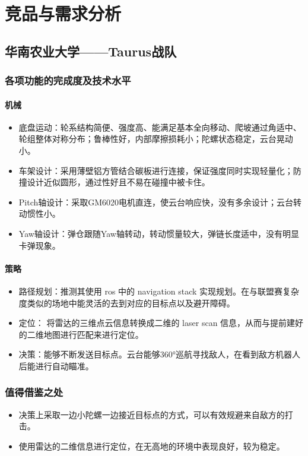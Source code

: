\chapter{竞品与需求分析}
\section{华南农业大学——Taurus战队}
\subsection{各项功能的完成度及技术水平}

\subsubsection{机械}
\begin{itemize}
      \item 底盘运动：轮系结构简便、强度高、能满足基本全向移动、爬坡通过角适中、轮组整体对称分布；鲁棒性好，内部摩擦损耗小；陀螺状态稳定，云台晃动小。
      \item 车架设计：采用薄壁铝方管结合碳板进行连接，保证强度同时实现轻量化；防撞设计近似圆形，通过性好且不易在碰撞中被卡住。
      \item Pitch轴设计：采取GM6020电机直连，使云台响应快，没有多余设计；云台转动惯性小。
      \item Yaw轴设计：弹仓跟随Yaw轴转动，转动惯量较大，弹链长度适中，没有明显卡弹现象。
\end{itemize}

\subsubsection{策略}
\begin{itemize}
      \item 路径规划：推测其使用 ros 中的 navigation stack 实现规划。在与联盟赛复杂度类似的场地中能灵活的去到对应的目标点以及避开障碍。
      \item 定位： 将雷达的三维点云信息转换成二维的 laser scan 信息，从而与提前建好的二维地图进行匹配来进行定位。
      \item 决策：能够不断发送目标点。云台能够$\ang{360}$巡航寻找敌人，在看到敌方机器人后能进行自动瞄准。      
\end{itemize}

\subsection{值得借鉴之处}
\begin{itemize}
      \item 决策上采取一边小陀螺一边接近目标点的方式，可以有效规避来自敌方的打击。
      \item 使用雷达的二维信息进行定位，在无高地的环境中表现良好，较为稳定。
   \end{itemize}

